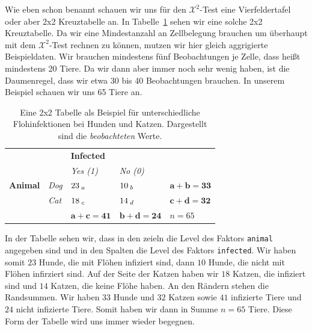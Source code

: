 \documentclass[
  letterpaper,
  DIV=11,
  oneside]{scrreport}
\begin{document}
Wie eben schon benannt schauen wir uns für den \(\mathcal{X}^2\)-Test
eine Vierfeldertafel oder aber 2x2 Kreuztabelle an. In
Tabelle~\ref{tbl-chi-square-obs} sehen wir eine solche 2x2 Kreuztabelle.
Da wir eine Mindestanzahl an Zellbelegung brauchen um überhaupt mit dem
\(\mathcal{X}^2\)-Test rechnen zu können, mutzen wir hier gleich
aggrigierte Beispieldaten. Wir brauchen mindestens fünf Beobachtungen je
Zelle, dass heißt mindestens 20 Tiere. Da wir dann aber immer noch sehr
wenig haben, ist die Daumenregel, dass wir etwa 30 bis 40 Beobachtungen
brauchen. In unserem Beispiel schauen wir uns 65 Tiere an.

\hypertarget{tbl-chi-square-obs}{}
\begin{longtable}[]{@{}
  >{\centering\arraybackslash}p{}
  >{\centering\arraybackslash}p{}
  >{\centering\arraybackslash}p{}
  >{\centering\arraybackslash}p{}
  >{\centering\arraybackslash}p{}@{}}
\caption{\label{tbl-chi-square-obs}Eine 2x2 Tabelle als Beispiel für
unterschiedliche Flohinfektionen bei Hunden und Katzen. Dargestellt sind
die \emph{beobachteten} Werte.}\tabularnewline
\toprule()
\endhead
& & \textbf{Infected} & & \\
& & \emph{Yes (1)} & \emph{No (0)} & \\
\textbf{Animal} & \emph{Dog} & \(23_{\;\Large a}\) & \(10_{\;\Large b}\)
& \(\mathbf{a+b = 33}\) \\
& \emph{Cat} & \(18_{\;\Large c}\) & \(14_{\;\Large d}\) &
\(\mathbf{c+d = 32}\) \\
& & \(\mathbf{a+c = 41}\) & \(\mathbf{b+d = 24}\) & \(n = 65\) \\
\bottomrule()
\end{longtable}

In der Tabelle sehen wir, dass in den zeieln die Level des Faktors
\texttt{animal} angegeben sind und in den Spalten die Level des Faktors
\texttt{infected}. Wir haben somit \(23\) Hunde, die mit Flöhen
infiziert sind, dann \(10\) Hunde, die nicht mit Flöhen infirziert sind.
Auf der Seite der Katzen haben wir \(18\) Katzen, die infiziert sind und
\(14\) Katzen, die keine Flöhe haben. An den Rändern stehen die
Randsummen. Wir haben \(33\) Hunde und \(32\) Katzen sowie \(41\)
infizierte Tiere und \(24\) nicht infizierte Tiere. Somit haben wir dann
in Summe \(n = 65\) Tiere. Diese Form der Tabelle wird uns immer wieder
begegnen.
\end{document}
